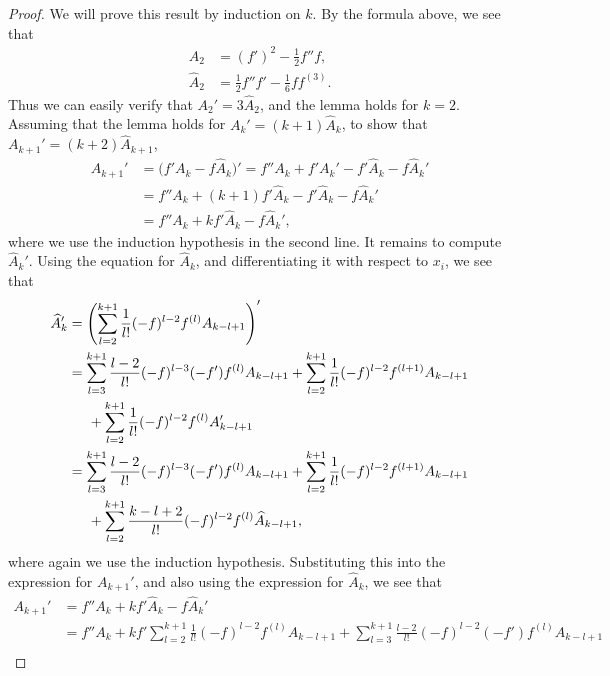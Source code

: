 \documentclass{article}
\begin{document}
\begin{proof}
  We will prove this result by induction on $k$. By the formula above, we see that 
  \begin{align*}
    A_{2} &= (f')^{2}-\frac{1}{2}f''f,\\
    \widehat{A}_{2} &= \frac{1}{2}f''f'-\frac{1}{6}ff^{(3)}.
  \end{align*}
  Thus we can easily verify that $A_{2}'=3\widehat{A}_{2}$, and the lemma holds for $k=2$. Assuming that the lemma holds for $A_{k}'=(k+1)\widehat{A}_{k}$, to show that $A_{k+1}'=(k+2)\widehat{A}_{k+1}$,
  \begin{align*}
    A_{k+1}' &= \big(f'A_{k}-f\widehat{A}_{k}\big)'=
    f''A_{k}+f'A_{k}'-f'\widehat{A}_{k}-f\widehat{A}_{k}'\\
    &= 
    f''A_{k}+(k+1)f'\widehat{A}_{k}-f'\widehat{A}_{k}-f\widehat{A}_{k}'\\
    &=
    f''A_{k}+kf'\widehat{A}_{k}-f\widehat{A}_{k}',
  \end{align*}
  where we use the induction hypothesis in the second line. It remains to compute $\widehat{A}_{k}'$. Using the equation for $\widehat{A}_{k}$, and differentiating it with respect to $x_{i}$, we see that 
  \begin{align*}
    \widehat{A}_{k}' &= \left(\sum_{l=2}^{k+1}\frac{1}{l!}(-f)^{l-2}f^{(l)}A_{k-l+1}\right)'\\
    &=
    \sum_{l=3}^{k+1}\frac{l-2}{l!}(-f)^{l-3}(-f')f^{(l)}A_{k-l+1} +\sum_{l=2}^{k+1}\frac{1}{l!}(-f)^{l-2}f^{(l+1)}A_{k-l+1}\\
&\hspace{0.5cm}+\sum_{l=2}^{k+1}\frac{1}{l!}(-f)^{l-2}f^{(l)}A_{k-l+1}'\\
    &=
    \sum_{l=3}^{k+1}\frac{l-2}{l!}(-f)^{l-3}(-f')f^{(l)}A_{k-l+1}+\sum_{l=2}^{k+1}\frac{1}{l!}(-f)^{l-2}f^{(l+1)}A_{k-l+1}\\
&\hspace{0.5cm}+\sum_{l=2}^{k+1}\frac{k-l+2}{l!}(-f)^{l-2}f^{(l)}\widehat{A}_{k-l+1},\\
  \end{align*}
  where again we use the induction hypothesis. Substituting this into the expression for $A_{k+1}'$, and also using the expression for $\widehat{A}_{k}$, we see that 
  \begin{align*}
    A_{k+1}' &= f''A_{k}+kf'\widehat{A}_{k}-f\widehat{A}_{k}'\\
    &=
    f''A_{k}+kf'\sum_{l=2}^{k+1}\frac{1}{l!}(-f)^{l-2}f^{(l)}A_{k-l+1}+\sum_{l=3}^{k+1}\frac{l-2}{l!}(-f)^{l-2}(-f')f^{(l)}A_{k-l+1}\\

\end{align*}
\end{proof}
\end{document}
